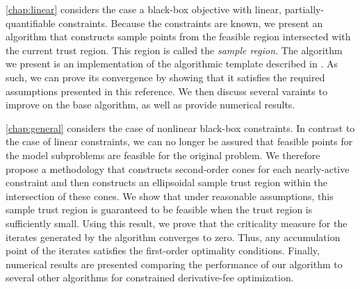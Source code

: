 % 
% 
% 

\cref{chap:linear} considers the case a black-box objective with linear,  partially-quantifiable constraints.
Because the constraints are known, we present an algorithm that constructs sample points from the feasible region intersected with the current trust region.
This region is called the {\em sample region}.
The algorithm we present is an implementation of the algorithmic template described in \cite{Conejo:2013:GCT:2620806.2621814}.
As such, we can prove its convergence by showing that it satisfies the required assumptions presented in this reference.
We then discuss several varaints to improve on the base algorithm, as well as provide numerical results.

\cref{chap:general} considers the case of nonlinear black-box constraints.
In contrast to the case of linear constraints, we can no longer be assured that feasible points for the model subproblems are feasible for the original problem.
We therefore propose a methodology that constructs second-order cones for each nearly-active constraint and then constructs an ellipsoidal sample trust region within the intersection of these cones.
We show that under reasonable assumptions, this sample trust region is guaranteed to be feasible when the trust region is sufficiently small.
Using this result,  we prove that the criticality measure for the iterates generated by the algorithm converges to zero.
Thus,  any accumulation point of the iterates satisfies the first-order optimality conditions.
Finally, numerical results are presented comparing the performance of our algorithm to several other algorithms for constrained derivative-fee optimization.

